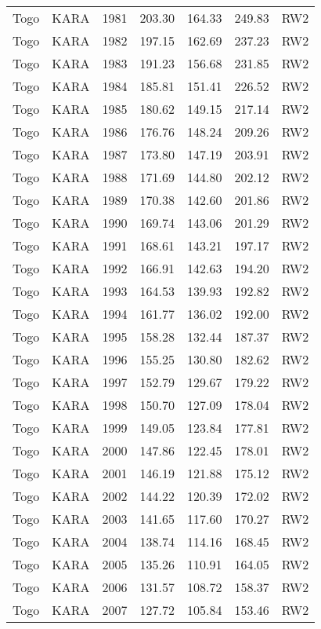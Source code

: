 \begin{longtable}{lllrrrl}
  Togo & KARA & 1981 & 203.30 & 164.33 & 249.83 & RW2 \\ 
  Togo & KARA & 1982 & 197.15 & 162.69 & 237.23 & RW2 \\ 
  Togo & KARA & 1983 & 191.23 & 156.68 & 231.85 & RW2 \\ 
  Togo & KARA & 1984 & 185.81 & 151.41 & 226.52 & RW2 \\ 
  Togo & KARA & 1985 & 180.62 & 149.15 & 217.14 & RW2 \\ 
  Togo & KARA & 1986 & 176.76 & 148.24 & 209.26 & RW2 \\ 
  Togo & KARA & 1987 & 173.80 & 147.19 & 203.91 & RW2 \\ 
  Togo & KARA & 1988 & 171.69 & 144.80 & 202.12 & RW2 \\ 
  Togo & KARA & 1989 & 170.38 & 142.60 & 201.86 & RW2 \\ 
  Togo & KARA & 1990 & 169.74 & 143.06 & 201.29 & RW2 \\ 
  Togo & KARA & 1991 & 168.61 & 143.21 & 197.17 & RW2 \\ 
  Togo & KARA & 1992 & 166.91 & 142.63 & 194.20 & RW2 \\ 
  Togo & KARA & 1993 & 164.53 & 139.93 & 192.82 & RW2 \\ 
  Togo & KARA & 1994 & 161.77 & 136.02 & 192.00 & RW2 \\ 
  Togo & KARA & 1995 & 158.28 & 132.44 & 187.37 & RW2 \\ 
  Togo & KARA & 1996 & 155.25 & 130.80 & 182.62 & RW2 \\ 
  Togo & KARA & 1997 & 152.79 & 129.67 & 179.22 & RW2 \\ 
  Togo & KARA & 1998 & 150.70 & 127.09 & 178.04 & RW2 \\ 
  Togo & KARA & 1999 & 149.05 & 123.84 & 177.81 & RW2 \\ 
  Togo & KARA & 2000 & 147.86 & 122.45 & 178.01 & RW2 \\ 
  Togo & KARA & 2001 & 146.19 & 121.88 & 175.12 & RW2 \\ 
  Togo & KARA & 2002 & 144.22 & 120.39 & 172.02 & RW2 \\ 
  Togo & KARA & 2003 & 141.65 & 117.60 & 170.27 & RW2 \\ 
  Togo & KARA & 2004 & 138.74 & 114.16 & 168.45 & RW2 \\ 
  Togo & KARA & 2005 & 135.26 & 110.91 & 164.05 & RW2 \\ 
  Togo & KARA & 2006 & 131.57 & 108.72 & 158.37 & RW2 \\ 
  Togo & KARA & 2007 & 127.72 & 105.84 & 153.46 & RW2 \\ 

\end{longtable}
